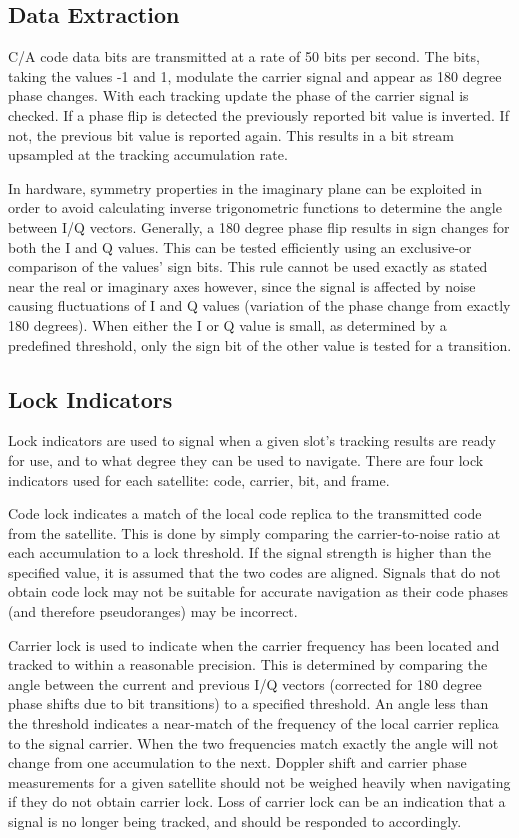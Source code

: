 \documentclass[12pt]{article}
\begin{document}
\subsection{Data Extraction}
C/A code data bits are transmitted at a rate of 50 bits per second. The bits, taking the values -1 and 1, modulate the carrier signal and appear as 180 degree phase changes. With each tracking update the phase of the carrier signal is checked. If a phase flip is detected the previously reported bit value is inverted. If not, the previous bit value is reported again. This results in a bit stream upsampled at the tracking accumulation rate.

In hardware, symmetry properties in the imaginary plane can be exploited in order to avoid calculating inverse trigonometric functions to determine the angle between I/Q vectors. Generally, a 180 degree phase flip results in sign changes for both the I and Q values. This can be tested efficiently using an exclusive-or comparison of the values' sign bits. This rule cannot be used exactly as stated near the real or imaginary axes however, since the signal is affected by noise causing fluctuations of I and Q values (variation of the phase change from exactly 180 degrees). When either the I or Q value is small, as determined by a predefined threshold, only the sign bit of the other value is tested for a transition.

\subsection{Lock Indicators}
Lock indicators are used to signal when a given slot's tracking results are ready for use, and to what degree they can be used to navigate. There are four lock indicators used for each satellite: code, carrier, bit, and frame.

Code lock indicates a match of the local code replica to the transmitted code from the satellite. This is done by simply comparing the carrier-to-noise ratio at each accumulation to a lock threshold. If the signal strength is higher than the specified value, it is assumed that the two codes are aligned. Signals that do not obtain code lock may not be suitable for accurate navigation as their code phases (and therefore pseudoranges) may be incorrect.

Carrier lock is used to indicate when the carrier frequency has been located and tracked to within a reasonable precision. This is determined by comparing the angle between the current and previous I/Q vectors (corrected for 180 degree phase shifts due to bit transitions) to a specified threshold. An angle less than the threshold indicates a near-match of the frequency of the local carrier replica to the signal carrier. When the two frequencies match exactly the angle will not change from one accumulation to the next. Doppler shift and carrier phase measurements for a given satellite should not be weighed heavily when navigating if they do not obtain carrier lock. Loss of carrier lock can be an indication that a signal is no longer being tracked, and should be responded to accordingly.
\end{document}
